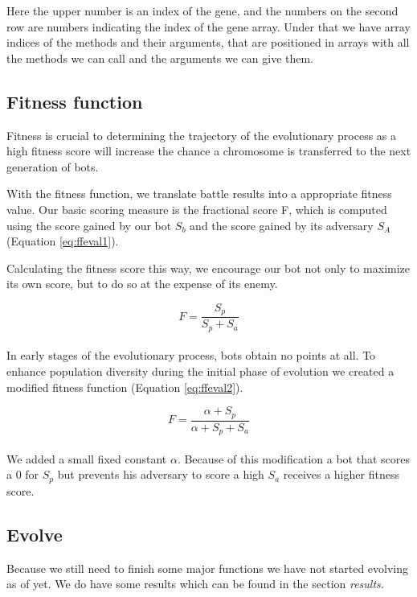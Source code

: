 \documentclass[a4paper,10pt]{article}
\begin{document}
Here the upper number is an index of the gene, and the numbers on the second row are numbers indicating the index of the gene array. Under that we have array indices of the methods and their arguments, that are positioned in arrays with all the methods we can call and the arguments we can give them.


\subsection{Fitness function}
Fitness is crucial to determining the trajectory of the evolutionary process as a high fitness score will increase the chance a chromosome is transferred to the next generation of bots.

With the fitness function, we translate battle results into a appropriate fitness value. Our basic scoring measure is the fractional score F, which is computed using the score gained by our bot $S_b$ and the score gained by its adversary $S_A$ (Equation \ref{eq:ffeval1}).

Calculating the fitness score this way, we encourage our bot not only to maximize its own score, but to do so at the expense of its enemy.

\begin{equation}
F = \frac{S_p}{S_p + S_a}
    \label{eq:ffeval1}
\end{equation} \\

In early stages of the evolutionary process, bots obtain no points at all. To enhance population diversity during the initial phase of evolution we created a modified fitness function (Equation \ref{eq:ffeval2}).

\begin{equation}
F = \frac{\alpha+S_p}{\alpha+S_p + S_a}
     \label{eq:ffeval2}
\end{equation} \\

We added a small fixed constant $\alpha$. Because of this modification a bot that scores a 0 for $S_p$ but prevents his adversary to score a high $S_a$ receives a higher fitness score.

\subsection{Evolve}
Because we still need to finish some major functions we have not started evolving as of yet. We do have some results which can be found in the section \textit{results}. 
\end{document}
